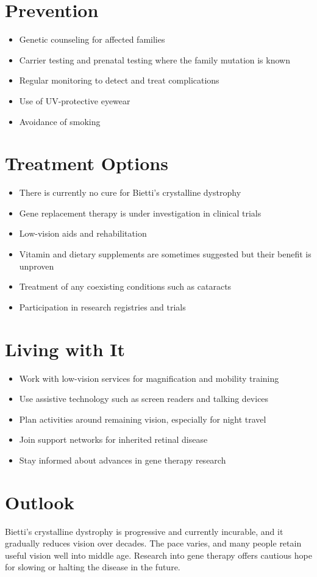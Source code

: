 \section{Prevention}
\begin{itemize}[noitemsep]
  \item Genetic counseling for affected families
  \item Carrier testing and prenatal testing where the family mutation is known
  \item Regular monitoring to detect and treat complications
  \item Use of UV-protective eyewear
  \item Avoidance of smoking
\end{itemize}
\section{Treatment Options}
\begin{itemize}[noitemsep]
  \item There is currently no cure for Bietti's crystalline dystrophy
  \item Gene replacement therapy is under investigation in clinical trials
  \item Low-vision aids and rehabilitation
  \item Vitamin and dietary supplements are sometimes suggested but their benefit is unproven
  \item Treatment of any coexisting conditions such as cataracts
  \item Participation in research registries and trials
\end{itemize}
\section{Living with It}
\begin{itemize}[noitemsep]
  \item Work with low-vision services for magnification and mobility training
  \item Use assistive technology such as screen readers and talking devices
  \item Plan activities around remaining vision, especially for night travel
  \item Join support networks for inherited retinal disease
  \item Stay informed about advances in gene therapy research
\end{itemize}
\section{Outlook}
Bietti's crystalline dystrophy is progressive and currently incurable, and it gradually reduces vision over decades. The pace varies, and many people retain useful vision well into middle age. Research into gene therapy offers cautious hope for slowing or halting the disease in the future.
